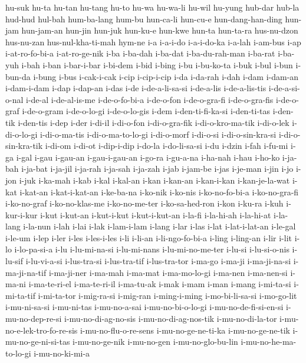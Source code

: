 {hu-suk hu-ta hu-tan hu-tang hu-to hu-wa hu-wa-li hu-wil hu-yung hub-dar
hub-la hud-hud hul-bah hum-ba-lang hum-bu hun-ca-li hun-cu-e
hun-dang-han-ding hun-jam hun-jam-an hun-jin hun-juk hun-ku-e hun-kwe
hun-ta hun-ta-ra hus-nu-dzon hus-nu-zan hus-nul-kha-ti-mah hym-ne i-a
i-a-i-do i-a-i-do-ka i-a-lah i-am-bus i-ap i-at-ro-fo-bi-a i-at-ro-ge-nik
i-ba i-ba-dah i-ba-dat i-ba-du-rah-man i-ba-rat i-ba-yuh i-bah i-ban
i-bar-i-bar i-bi-dem i-bid i-bing i-bu i-bu-ko-ta i-buk i-bul i-bun
i-bun-da i-bung i-bus i-cak-i-cak i-cip i-cip-i-cip i-da i-da-rah i-dah
i-dam i-dam-an i-dam-i-dam i-dap i-dap-an i-das i-de i-de-a-li-sa-si
i-de-a-lis i-de-a-lis-tis i-de-a-si-o-nal i-de-al i-de-al-is-me
i-de-o-fo-bi-a i-de-o-fon i-de-o-gra-fi i-de-o-gra-fis i-de-o-graf
i-de-o-gram i-de-o-lo-gi i-de-o-lo-gis i-dem i-den-ti-fi-ka-si
i-den-ti-tas i-den-tik i-den-tis i-dep i-der i-di-il i-di-o-fon
i-di-o-gra-fik i-di-o-kro-ma-tik i-di-o-lek i-di-o-lo-gi i-di-o-ma-tis
i-di-o-ma-to-lo-gi i-di-o-morf i-di-o-si i-di-o-sin-kra-si
i-di-o-sin-kra-tik i-di-om i-di-ot i-dip-i-dip i-do-la i-do-li-sa-si i-du
i-dzin i-fah i-fu-mi i-ga i-gal i-gau i-gau-an i-gau-i-gau-an i-go-ra
i-gu-a-na i-ha-nah i-hau i-ho-ko i-ja-bah i-ja-bat i-ja-jil i-ja-rah
i-ja-sah i-ja-zah i-jab i-jam-be i-jas i-je-man i-jin i-jo i-jon i-juk
i-ka-mah i-kab i-kal i-kal-an i-kan i-kan-an i-kan-i-kan i-kan-je-la-wat
i-kat i-kat-an i-kat-i-kat-an i-ke-ba-na i-ko-nik i-ko-nis i-ko-no-fo-bi-a
i-ko-no-gra-fi i-ko-no-graf i-ko-no-klas-me i-ko-no-me-ter i-ko-sa-hed-ron
i-kon i-ku-ra i-kuh i-kur-i-kur i-kut i-kut-an i-kut-i-kut i-kut-i-kut-an
i-la-fi i-la-hi-ah i-la-hi-at i-la-lang i-la-nun i-lah i-lai i-lak
i-lam-i-lam i-lang i-lar i-las i-lat i-lat-i-lat-an i-le-gal i-le-um i-lep
i-ler i-les i-les-i-les i-li i-li-an i-li-ngo-fo-bi-a i-ling i-ling-an
i-lir i-lit i-lo i-lo-pa-si-a i-lu i-lu-mi-na-si i-lu-mi-nans
i-lu-mi-no-me-ter i-lu-si i-lu-si-o-nis i-lu-sif i-lu-vi-a-si i-lus-tra-si
i-lus-tra-tif i-lus-tra-tor i-ma-go i-ma-ji i-ma-ji-na-si i-ma-ji-na-tif
i-ma-ji-ner i-ma-mah i-ma-mat i-ma-mo-lo-gi i-ma-nen i-ma-nen-si i-ma-ni
i-ma-te-ri-el i-ma-te-ri-il i-ma-tu-ak i-mak i-mam i-man i-mang i-mi-ta-si
i-mi-ta-tif i-mi-ta-tor i-mig-ra-si i-mig-ran i-ming-i-ming
i-mo-bi-li-sa-si i-mo-go-lit i-mu-ni-sa-si i-mu-ni-tas i-mu-no-a-sai
i-mu-no-bi-o-lo-gi i-mu-no-de-fi-si-en-si i-mu-no-dep-re-si
i-mu-no-di-ag-no-sis i-mu-no-di-ag-nos-tik i-mu-no-di-la-tor
i-mu-no-e-lek-tro-fo-re-sis i-mu-no-flu-o-re-sens i-mu-no-ge-ne-ti-ka
i-mu-no-ge-ne-tik i-mu-no-ge-ni-si-tas i-mu-no-ge-nik i-mu-no-gen
i-mu-no-glo-bu-lin i-mu-no-he-ma-to-lo-gi i-mu-no-ki-mi-a
}
